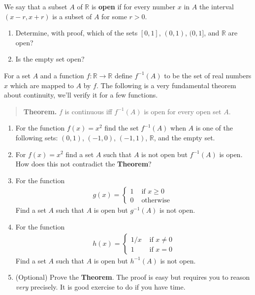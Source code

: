 \documentclass[9pt, a4paper, oneside]{amsart}
\begin{document}
\begin{questions}
	\item We say that a subset $ A$ of $ \mathbb{R}$ is \textbf{open} if for every number $ x$ in $A$ the interval $ (x-r,x+r)$ is a subset of $ A$ for some $ r>0$.
	\begin{enumerate}
		\item Determine, with proof, which of the sets $ [0,1]$, $(0,1)$, $(0,1]$, and $\mathbb{R}$ are open?
			\item Is the empty set open?
		\end{enumerate}
		For a set $ A$ and a function $ f: \mathbb{R} \rightarrow \mathbb{R}$	define $ f^{-1}(A)$ to be the set of real numbers $ x$ which are mapped to $ A$ by $ f$. The following is a very fundamental theorem about continuity, we'll verify it for a few functions.
		\begin{quote}
			\textbf{Theorem.} $ f$ is continuous iff $ f^{-1}(A)$ is open for every open set $ A$.
		\end{quote}
		\begin{enumerate}[resume]
			\item For the function $ f(x) = x^2$ find the set $ f^{-1}(A)$ when $ A$ is one of the following sets: $ (0,1)$, $ (-1,0)$, $ (-1,1)$, $ \mathbb{R}$, and the empty set.
			\item For $ f(x) = x^2$ find a set $ A$ such that $ A$ is not open but $ f^{-1}(A)$ is open. How does this not contradict the \textbf{Theorem}?
			\item For the function
			      \begin{align*}
			      	g(x) = \begin{cases} 1 & \mbox{ if } x \ge 0 \\ 0 &\mbox{ otherwise }\end{cases}
			      \end{align*}
			      Find a set $ A$ such that $ A$ is open but $g^{-1}(A)$ is not open.
			\item For the function
			      \begin{align*}
			      	h(x) = \begin{cases} 1/x & \mbox{ if $x \neq 0$} \\ 1 &\mbox{ if $x = 0$} \end{cases}
			      \end{align*}
			      Find a set $ A$ such that $ A$ is open but $h^{-1}(A)$ is not open.
			\item (Optional) Prove the \textbf{Theorem}. The proof is easy but requires you to reason \emph{very} precisely. It is good exercise to do if you have time.
		\end{enumerate}

	\end{questions}
\end{document}
